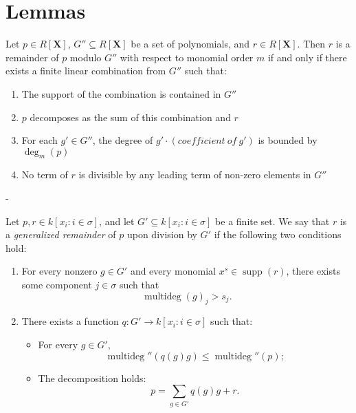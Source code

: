 \chapter{Lemmas}

\begin{lemma}\label{MonomialOrder.zero_le}
  \leanok


\end{lemma}

\begin{lemma}\label{MonomialOrder.IsRemainder_def'}
  \leanok
  Let $p \in R[\mathbf{X}]$, $G'' \subseteq R[\mathbf{X}]$ be a set of polynomials,
and $r \in R[\mathbf{X}]$. Then $r$ is a remainder of $p$ modulo $G''$ with respect to
monomial order $m$ if and only if there exists a finite linear combination from $G''$
such that:
\begin{enumerate}
\item The support of the combination is contained in $G''$
\item $p$ decomposes as the sum of this combination and $r$
\item For each $g' \in G''$, the degree of $g' \cdot (coefficient\ of\ g')$
  is bounded by $\deg_m(p)$
\item No term of $r$ is divisible by any leading term of non-zero elements in $G''$
\end{enumerate}
-
\end{lemma}

\begin{lemma}\label{MonomialOrder.IsRemainder_def''}
  \leanok
  Let \( p, r \in k[x_i : i \in \sigma] \), and let \( G' \subseteq k[x_i : i \in \sigma] \) be a finite set.
We say that \( r \) is a \emph{generalized remainder} of \( p \) upon division by \( G' \) if the following two conditions hold:

\begin{enumerate}
\item For every nonzero \( g \in G' \) and every monomial \( x^s \in \operatorname{supp}(r) \),
there exists some component \( j \in \sigma \) such that
\[
\operatorname{multideg}(g)_j > s_j.
\]
\item There exists a function \( q : G' \to k[x_i : i \in \sigma] \) such that:
\begin{itemize}
\item For every \( g \in G' \),
  \[
  \operatorname{multideg}''(q(g)g) \leq \operatorname{multideg}''(p);
  \]
\item The decomposition holds:
  \[
  p = \sum_{g \in G'} q(g)g + r.
  \]
\end{itemize}
\end{enumerate}

\end{lemma}

